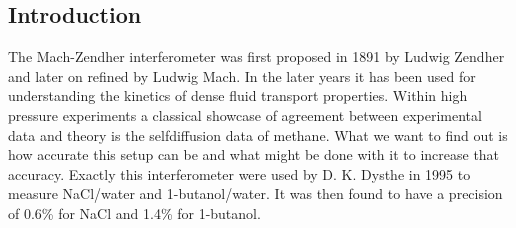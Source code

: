 \subsection {Introduction}
  The Mach-Zendher interferometer was first proposed in 1891 by Ludwig Zendher
  \cite{lz} and later on refined by Ludwig Mach\cite{lm}.
  In the later years it has been used for understanding the kinetics of dense
  fluid transport properties\cite{th,dym}.
  Within high pressure experiments a classical showcase of agreement between
  experimental data and theory is the selfdiffusion data of methane\cite{ht,ew}.
  What we want to find out is how accurate this setup can be and what might be
  done with it to increase that accuracy.
  Exactly this interferometer were used by D. K. Dysthe in 1995 to measure
  NaCl/water and 1-butanol/water. It was then found to have a precision
  of 0.6\% for NaCl and 1.4\% for 1-butanol\cite{dag}.
